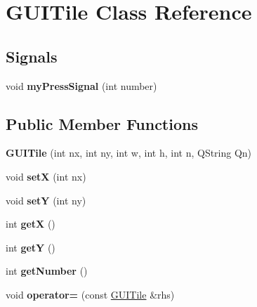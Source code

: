 \hypertarget{classGUITile}{\section{\-G\-U\-I\-Tile \-Class \-Reference}
\label{classGUITile}
}
\subsection*{\-Signals}
\begin{DoxyCompactItemize}
\item 
\hypertarget{classGUITile_a2bac4f0555507c82afa2ef1304280006}{void {\bfseries my\-Press\-Signal} (int number)}\label{classGUITile_a2bac4f0555507c82afa2ef1304280006}

\end{DoxyCompactItemize}
\subsection*{\-Public \-Member \-Functions}
\begin{DoxyCompactItemize}
\item 
\hypertarget{classGUITile_a2fea9396767e186463348c1f23f8a1fb}{{\bfseries \-G\-U\-I\-Tile} (int nx, int ny, int w, int h, int n, \-Q\-String \-Qn)}\label{classGUITile_a2fea9396767e186463348c1f23f8a1fb}

\item 
\hypertarget{classGUITile_a835186265d90bbf4e1b367557cc1dc2a}{void {\bfseries set\-X} (int nx)}\label{classGUITile_a835186265d90bbf4e1b367557cc1dc2a}

\item 
\hypertarget{classGUITile_abf1cdc1adfd9ea9de6944cdd4794e437}{void {\bfseries set\-Y} (int ny)}\label{classGUITile_abf1cdc1adfd9ea9de6944cdd4794e437}

\item 
\hypertarget{classGUITile_aa9bb3eaa1bcfe6032805593db8fb0a86}{int {\bfseries get\-X} ()}\label{classGUITile_aa9bb3eaa1bcfe6032805593db8fb0a86}

\item 
\hypertarget{classGUITile_a22c037d69a48973ea0f71caa65a28f4a}{int {\bfseries get\-Y} ()}\label{classGUITile_a22c037d69a48973ea0f71caa65a28f4a}

\item 
\hypertarget{classGUITile_a0d7d290c5c0f03b7a2d8493fe4e66bc3}{int {\bfseries get\-Number} ()}\label{classGUITile_a0d7d290c5c0f03b7a2d8493fe4e66bc3}

\item 
\hypertarget{classGUITile_aec7dc019a373222a6350ee0e01f6ec5b}{void {\bfseries operator=} (const \hyperlink{classGUITile}{\-G\-U\-I\-Tile} \&rhs)}\label{classGUITile_aec7dc019a373222a6350ee0e01f6ec5b}

\end{DoxyCompactItemize}

